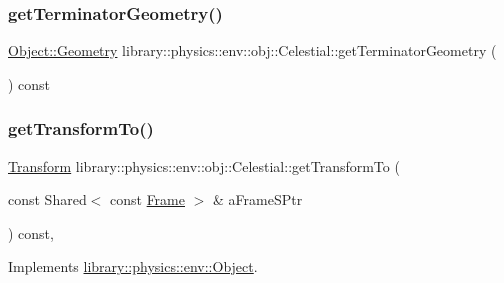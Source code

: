 \subsubsection{\texorpdfstring{get\+Terminator\+Geometry()}{getTerminatorGeometry()}}
{\footnotesize\ttfamily \hyperlink{classlibrary_1_1physics_1_1env_1_1_object_abdf50733c7ad97327fb64edca5670f13}{Object\+::\+Geometry} library\+::physics\+::env\+::obj\+::\+Celestial\+::get\+Terminator\+Geometry (\begin{DoxyParamCaption}{ }\end{DoxyParamCaption}) const}

\mbox{\label{classlibrary_1_1physics_1_1env_1_1obj_1_1_celestial_ac6676b10ebbb63a8483137c9c734c58a}} 
\subsubsection{\texorpdfstring{get\+Transform\+To()}{getTransformTo()}}
{\footnotesize\ttfamily \hyperlink{classlibrary_1_1physics_1_1coord_1_1_transform}{Transform} library\+::physics\+::env\+::obj\+::\+Celestial\+::get\+Transform\+To (\begin{DoxyParamCaption}\item[{const Shared$<$ const \hyperlink{classlibrary_1_1physics_1_1coord_1_1_frame}{Frame} $>$ \&}]{a\+Frame\+S\+Ptr }\end{DoxyParamCaption}) const\hspace{0.3cm}{\ttfamily [override]}, {\ttfamily [virtual]}}



Implements \hyperlink{classlibrary_1_1physics_1_1env_1_1_object_abe850e2334c19ae185456cd52aeeca7d}{library\+::physics\+::env\+::\+Object}.

\mbox{\label{classlibrary_1_1physics_1_1env_1_1obj_1_1_celestial_ae020ad574249ea82679347c0a6933355}} 
